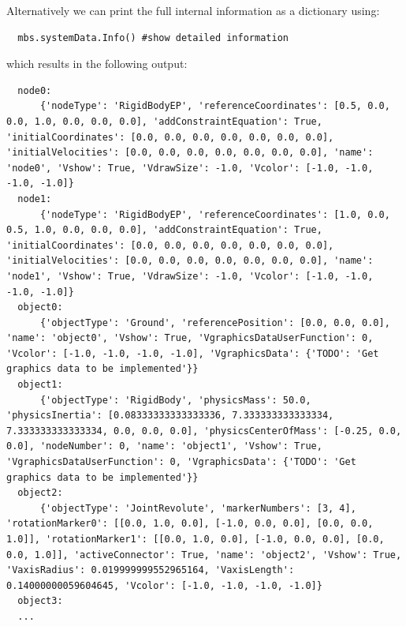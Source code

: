 Alternatively we can print the full internal information as a dictionary using:
\pythonstyle\begin{lstlisting}
  mbs.systemData.Info() #show detailed information
\end{lstlisting}
which results in the following output:
\plainlststyle
\begin{lstlisting}
  node0:
      {'nodeType': 'RigidBodyEP', 'referenceCoordinates': [0.5, 0.0, 0.0, 1.0, 0.0, 0.0, 0.0], 'addConstraintEquation': True, 'initialCoordinates': [0.0, 0.0, 0.0, 0.0, 0.0, 0.0, 0.0], 'initialVelocities': [0.0, 0.0, 0.0, 0.0, 0.0, 0.0, 0.0], 'name': 'node0', 'Vshow': True, 'VdrawSize': -1.0, 'Vcolor': [-1.0, -1.0, -1.0, -1.0]}
  node1:
      {'nodeType': 'RigidBodyEP', 'referenceCoordinates': [1.0, 0.0, 0.5, 1.0, 0.0, 0.0, 0.0], 'addConstraintEquation': True, 'initialCoordinates': [0.0, 0.0, 0.0, 0.0, 0.0, 0.0, 0.0], 'initialVelocities': [0.0, 0.0, 0.0, 0.0, 0.0, 0.0, 0.0], 'name': 'node1', 'Vshow': True, 'VdrawSize': -1.0, 'Vcolor': [-1.0, -1.0, -1.0, -1.0]}
  object0:
      {'objectType': 'Ground', 'referencePosition': [0.0, 0.0, 0.0], 'name': 'object0', 'Vshow': True, 'VgraphicsDataUserFunction': 0, 'Vcolor': [-1.0, -1.0, -1.0, -1.0], 'VgraphicsData': {'TODO': 'Get graphics data to be implemented'}}
  object1:
      {'objectType': 'RigidBody', 'physicsMass': 50.0, 'physicsInertia': [0.08333333333333336, 7.333333333333334, 7.333333333333334, 0.0, 0.0, 0.0], 'physicsCenterOfMass': [-0.25, 0.0, 0.0], 'nodeNumber': 0, 'name': 'object1', 'Vshow': True, 'VgraphicsDataUserFunction': 0, 'VgraphicsData': {'TODO': 'Get graphics data to be implemented'}}
  object2:
      {'objectType': 'JointRevolute', 'markerNumbers': [3, 4], 'rotationMarker0': [[0.0, 1.0, 0.0], [-1.0, 0.0, 0.0], [0.0, 0.0, 1.0]], 'rotationMarker1': [[0.0, 1.0, 0.0], [-1.0, 0.0, 0.0], [0.0, 0.0, 1.0]], 'activeConnector': True, 'name': 'object2', 'Vshow': True, 'VaxisRadius': 0.019999999552965164, 'VaxisLength': 0.14000000059604645, 'Vcolor': [-1.0, -1.0, -1.0, -1.0]}
  object3:
  ...
\end{lstlisting}


